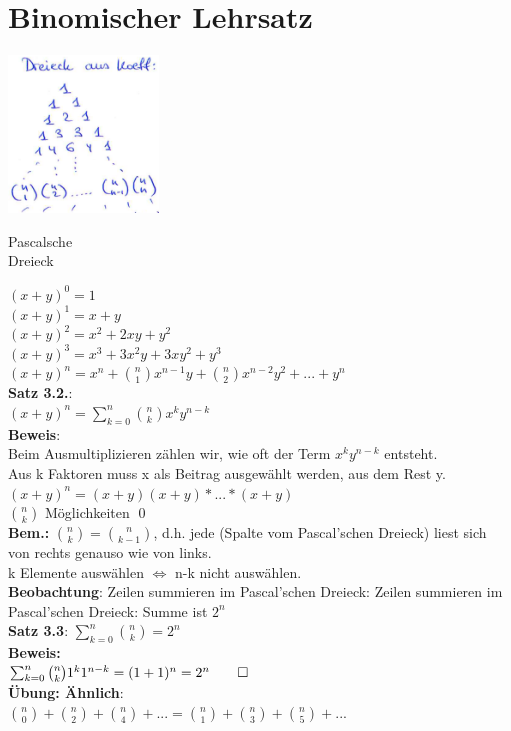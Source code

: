 \section{Binomischer Lehrsatz}
\begin{floatingfigure}[r]{6cm}
	\mbox{\includegraphics[width=0.3\textwidth]{img/pascal.PNG}}
	\caption{Pascalsche\\ Dreieck}
\end{floatingfigure}
$(x+y)^0=1$\\
$(x+y)^1 = x+y$\\
$(x+y)^2 = x^2+2xy+y^2$\\
$(x+y)^3= x^3+3x^2y+3xy^2+y^3$\medskip\\
$(x+y)^n=x^n+\binom{n}{1}x^{n-1}y+\binom{n}{2}x^{n-2}y^2+...+y^n$\medskip\\ 
\textbf{Satz 3.2.}:\\
$(x+y)^n =\sum^n_{k=0} \binom{n}{k}x^ky^{n-k}$\medskip\\
\textbf{Beweis}: \\
Beim Ausmultiplizieren zählen wir, wie oft der Term $x^ky^{n-k}$ entsteht.\\
Aus k Faktoren muss x als Beitrag ausgewählt werden, aus dem Rest y.
$(x+y)^n=(x+y)(x+y)*...*(x+y)$\\
$\binom{n}{k}$ Möglichkeiten \qed\medskip\\
\textbf{Bem.:} $\binom{n}{k}=\binom{n}{k-1}$, d.h. jede (Spalte vom Pascal'schen Dreieck) liest sich von rechts genauso wie von links.\\
k Elemente auswählen $\Leftrightarrow$ n-k nicht auswählen.\\
 \textbf{Beobachtung}: Zeilen summieren im Pascal'schen Dreieck: Zeilen summieren im Pascal'schen Dreieck: Summe ist $2^n$\medskip\\
 \textbf{Satz 3.3}: $\sum^n_{k=0} \binom{n}{k} = 2^n$\\
 \textbf{Beweis:}\\
 $\sum^n_{k=0}\binom{n}{k}1^k1^{n-k} = (1+1)^n=2^n\qed$\\
 \textbf{Übung: Ähnlich}:\\
 $\binom{n}{0}+\binom{n}{2}+\binom{n}{4}+...=\binom{n}{1}+\binom{n}{3}+\binom{n}{5}+...$\newpage

